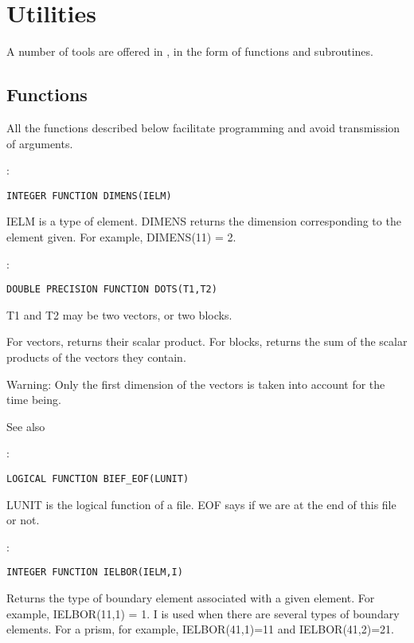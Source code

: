 \section{Utilities}

A number of tools are offered in \bief, in the form of functions and subroutines.

\subsection{Functions}

All the functions described below facilitate programming and avoid transmission of arguments.

:
\begin{lstlisting}[language=TelFortran]
INTEGER FUNCTION DIMENS(IELM)
\end{lstlisting}

IELM is a type of element. DIMENS returns the dimension corresponding to the
element given. For example, DIMENS(11) = 2.

:
\begin{lstlisting}[language=TelFortran]
DOUBLE PRECISION FUNCTION DOTS(T1,T2)
\end{lstlisting}

T1 and T2 may be two vectors, or two blocks.

For vectors, returns their scalar product. For blocks, returns the sum of the
scalar products of the vectors they contain.

\begin{WarningBlock}{Warning:}
Only the first dimension of the vectors is taken into account for the time being.
\end{WarningBlock}

See also 

:
\begin{lstlisting}[language=TelFortran]
LOGICAL FUNCTION BIEF_EOF(LUNIT)
\end{lstlisting}

LUNIT is the logical function of a file. EOF says if we are at the end of this
file or not.

:
\begin{lstlisting}[language=TelFortran]
INTEGER FUNCTION IELBOR(IELM,I)
\end{lstlisting}

Returns the type of boundary element associated with a given element. For
example, IELBOR(11,1) = 1. I is used when there are several types of boundary
elements. For a prism, for example, IELBOR(41,1)=11 and IELBOR(41,2)=21.

